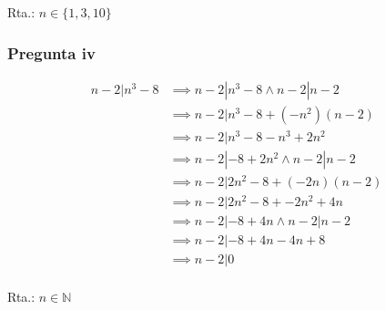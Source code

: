 Rta.: $ n \in \{ 1,3,10 \} $

\subsubsection{Pregunta iv}
\begin{align*}
    n-2 | n^3-8 &\implies n-2 | n^3-8 \wedge n-2 | n-2 \\
    &\implies n-2 | n^3-8 +(-n^2)(n-2) \\
    &\implies n-2 | n^3 - 8 -n^3 + 2n^2 \\
    &\implies n-2 | - 8 + 2n^2 \wedge n-2 | n-2 \\
    &\implies n-2 | 2n^2 - 8 + (-2n)(n-2) \\
    &\implies n-2 | 2n^2 - 8 + -2n^2 + 4n \\
    &\implies n-2 | - 8 + 4n \wedge n-2 | n-2 \\
    &\implies n-2 | - 8 + 4n -4n+8 \\
    &\implies n-2 | 0 \\
\end{align*}

Rta.: $ n \in \mathbb{N} $


